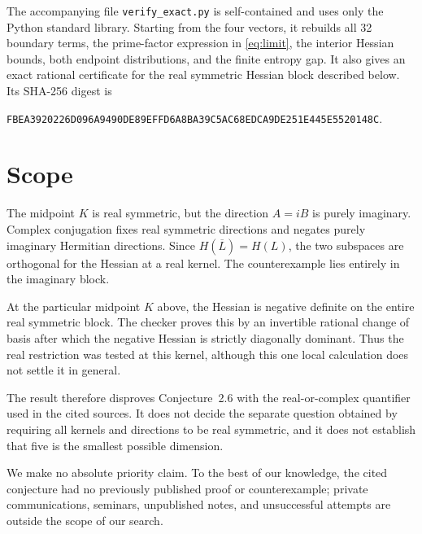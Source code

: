 \documentclass[11pt]{article}
\begin{document}
The accompanying file \texttt{verify\_exact.py} is self-contained and uses only
the Python standard library.  Starting from the four vectors, it rebuilds all 32
boundary terms, the prime-factor expression in \eqref{eq:limit}, the interior
Hessian bounds, both endpoint distributions, and the finite entropy gap.  It
also gives an exact rational certificate for the real symmetric Hessian block
described below.  Its
SHA-256 digest is
\begin{center}
\small\texttt{FBEA3920226D096A9490DE89EFFD6A8BA39C5AC68EDCA9DE251E445E5520148C}.
\end{center}

\section{Scope}

The midpoint \(K\) is real symmetric, but the direction \(A=iB\) is purely
imaginary.  Complex conjugation fixes real symmetric directions and negates
purely imaginary Hermitian directions.  Since \(H(\overline L)=H(L)\), the two
subspaces are orthogonal for the Hessian at a real kernel.  The counterexample
lies entirely in the imaginary block.

At the particular midpoint \(K\) above, the Hessian is negative definite on the
entire real symmetric block.  The checker proves this by an invertible rational
change of basis after which the negative Hessian is strictly diagonally
dominant.  Thus the real restriction was tested at this kernel, although this
one local calculation does not settle it in general.

The result therefore disproves Conjecture~2.6 with the real-or-complex
quantifier used in the cited sources.  It does not decide the separate question
obtained by requiring all kernels and directions to be real symmetric, and it
does not establish that five is the smallest possible dimension.

We make no absolute priority claim.  To the best of our knowledge, the cited
conjecture had no previously published proof or counterexample; private
communications, seminars, unpublished notes, and unsuccessful attempts are
outside the scope of our search.



\end{document}
